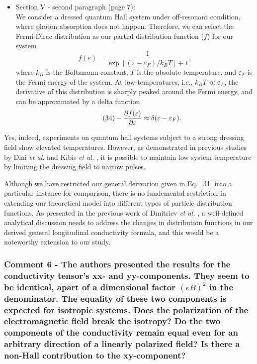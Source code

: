 \documentclass{article}
\begin{document}
\begin{itemize}
  \item Section V - second paragraph (page 7):\\
  {\color{Red}
  We consider a dressed quantum Hall system under off-resonant condition, where photon absorption does not happen. Therefore, we can select the Fermi-Dirac distribution as our partial distribution function ($f$) for our system
  \begin{equation} \tag{33}
    f(\varepsilon) = \frac{1}{\exp[(\varepsilon - \varepsilon_F)/k_B T]+1},
  \end{equation}
  where $k_B$ is the Boltzmann constant, $T$ is the absolute temperature, and $\varepsilon_F$ is the Fermi energy of the system. At low-temperatures, i.e., $k_BT \ll \varepsilon_F$, the derivative of this distribution is sharply peaked around the Fermi energy, and can be approximated by a delta function \cite{endo09}
  \begin{equation} \tag{34}
    - \pdv{f(\varepsilon)}{\varepsilon} \approx \delta(\varepsilon - \varepsilon_F).
  \end{equation}
  }
\end{itemize}

Yes, indeed, experiments on quantum hall systems subject to a strong dressing field show elevated temperatures. However, as demonstrated in previous studies by Dini \textit{et al.} \cite{dini16} and Kibis \textit{et al.} \cite{kibis15}, it is possible to maintain low system temperature by limiting the dressing field to narrow pulses.

Although we have restricted our general derivation given in Eq.~[31] into a particular instance for comparison, there is no fundemental restriction in extending our theoretical model into different types of particle distribution functions. As presented in the previous work of Dmitriev \textit{et al.} \cite{dmitriev05}, a well-defined analytical discussion needs to address the changes in distribution functions in our derived general longitudinal conductivity formula, and this would be a noteworthy extension to our study.

\subsubsection*{Comment 6 -
\color{RoyalBlue} The authors presented the results for the conductivity tensor's xx- and yy-components. They seem to be identical, apart of a dimensional factor $(eB)^2$ in the denominator. The equality of these two components is expected for isotropic systems. Does the polarization of the electromagnetic field break the isotropy? Do the two components of the conductivity remain equal even for an arbitrary direction of a linearly polarized field? Is there a non-Hall contribution to the xy-component?
}
\end{document}
